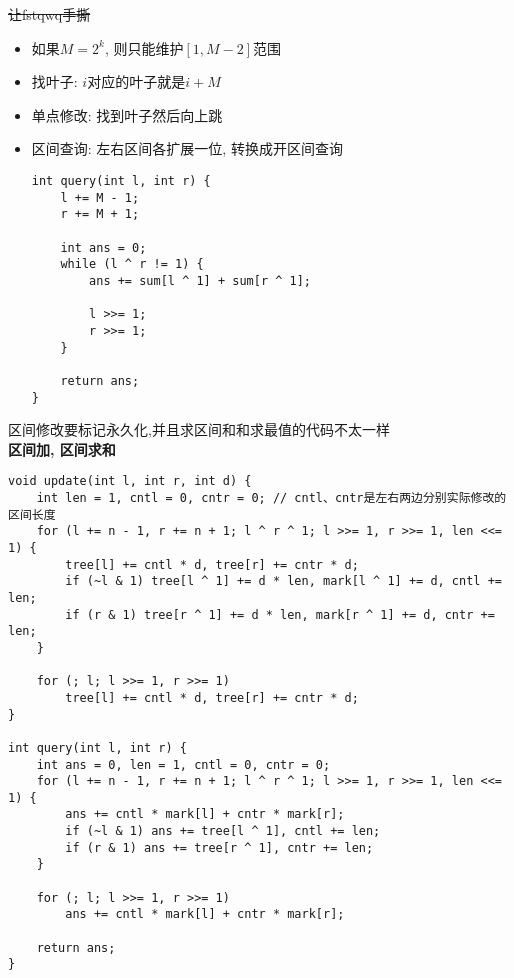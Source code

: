 \sout{让fstqwq手撕}

\begin{itemize}
	\item 如果$M = 2^k$, 则只能维护$[1, M - 2]$范围
	\item 找叶子: $i$对应的叶子就是$i + M$
	\item 单点修改: 找到叶子然后向上跳
	\item 区间查询: 左右区间各扩展一位, 转换成开区间查询
\begin{verbatim}
int query(int l, int r) {
	l += M - 1;
	r += M + 1;

	int ans = 0;
	while (l ^ r != 1) {
		ans += sum[l ^ 1] + sum[r ^ 1];

		l >>= 1;
		r >>= 1;
	}

	return ans;
}
\end{verbatim}

\end{itemize}
	
区间修改要标记永久化,并且求区间和和求最值的代码不太一样 \\

\textbf{区间加, 区间求和}
\begin{verbatim}
void update(int l, int r, int d) {
	int len = 1, cntl = 0, cntr = 0; // cntl、cntr是左右两边分别实际修改的区间长度
	for (l += n - 1, r += n + 1; l ^ r ^ 1; l >>= 1, r >>= 1, len <<= 1) {
		tree[l] += cntl * d, tree[r] += cntr * d;
		if (~l & 1) tree[l ^ 1] += d * len, mark[l ^ 1] += d, cntl += len;
		if (r & 1) tree[r ^ 1] += d * len, mark[r ^ 1] += d, cntr += len;
	}

	for (; l; l >>= 1, r >>= 1)
		tree[l] += cntl * d, tree[r] += cntr * d;
}

int query(int l, int r) {
	int ans = 0, len = 1, cntl = 0, cntr = 0;
	for (l += n - 1, r += n + 1; l ^ r ^ 1; l >>= 1, r >>= 1, len <<= 1) {
		ans += cntl * mark[l] + cntr * mark[r];
		if (~l & 1) ans += tree[l ^ 1], cntl += len;
		if (r & 1) ans += tree[r ^ 1], cntr += len;
	}

	for (; l; l >>= 1, r >>= 1)
		ans += cntl * mark[l] + cntr * mark[r];

	return ans;
}
\end{verbatim}

